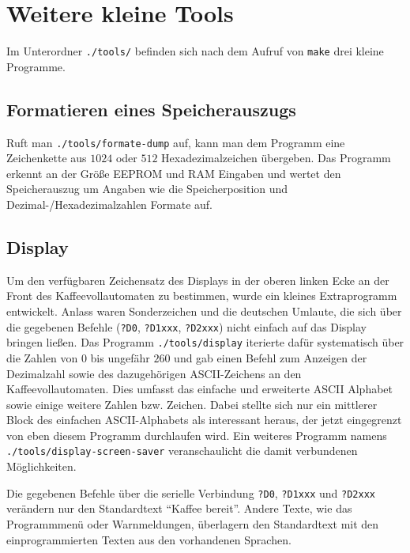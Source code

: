 \section{Weitere kleine Tools}\label{subsec:tools}
Im Unterordner \texttt{./tools/} befinden sich nach dem Aufruf von \texttt{make} drei kleine Programme.

\subsection{Formatieren eines Speicherauszugs}\label{subsec:formate-dump}
Ruft man \texttt{./tools/formate-dump} auf, kann man dem Programm eine Zeichenkette aus $1024$ oder $512$ Hexadezimalzeichen übergeben.
Das Programm erkennt an der Größe \ac{EEPROM} und \ac{RAM} Eingaben und wertet den Speicherauszug um Angaben wie die Speicherposition und Dezimal-/Hexadezimalzahlen Formate auf.

\subsection{Display}
Um den verfügbaren Zeichensatz des Displays in der oberen linken Ecke an der Front des Kaffeevollautomaten zu bestimmen, wurde ein kleines Extraprogramm entwickelt.
Anlass waren Sonderzeichen und die deutschen Umlaute, die sich über die gegebenen Befehle (\texttt{?D0}, \texttt{?D1xxx}, \texttt{?D2xxx}) nicht einfach auf das Display bringen ließen.
Das Programm \texttt{./tools/display} iterierte dafür systematisch über die Zahlen von $0$ bis ungefähr $260$ und gab einen Befehl zum Anzeigen der Dezimalzahl sowie des dazugehörigen \ac{ASCII}-Zeichens an den Kaffeevollautomaten.
Dies umfasst das einfache und erweiterte \ac{ASCII} Alphabet sowie einige weitere Zahlen bzw. Zeichen.
Dabei stellte sich nur ein mittlerer Block des einfachen \ac{ASCII}-Alphabets als interessant heraus, der jetzt eingegrenzt von eben diesem Programm durchlaufen wird.
Ein weiteres Programm namens \texttt{./tools/display-screen-saver} veranschaulicht die damit verbundenen Möglichkeiten.

Die gegebenen Befehle über die serielle Verbindung \texttt{?D0}, \texttt{?D1xxx} und \texttt{?D2xxx} verändern nur den Standardtext "`Kaffee bereit"'.
Andere Texte, wie das Programmmenü oder Warnmeldungen, überlagern den Standardtext mit den einprogrammierten Texten aus den vorhandenen Sprachen.


